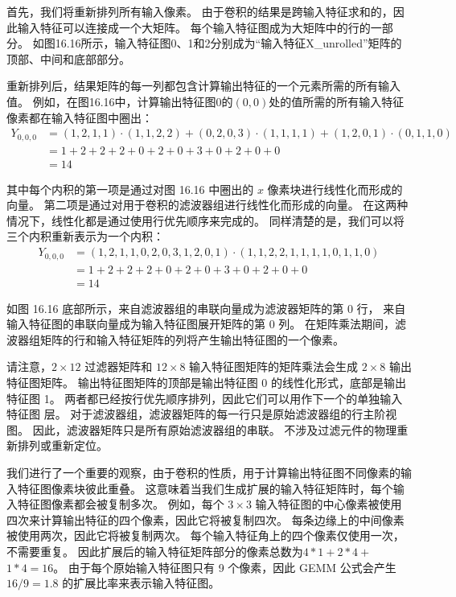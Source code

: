 首先，我们将重新排列所有输入像素。 由于卷积的结果是跨输入特征求和的，因此输入特征可以连接成一个大矩阵。 
每个输入特征图成为大矩阵中的行的一部分。 
如图16.16所示，输入特征图0、1和2分别成为“输入特征X\_unrolled”矩阵的顶部、中间和底部部分。

重新排列后，结果矩阵的每一列都包含计算输出特征的一个元素所需的所有输入值。 
例如，在图16.16中，计算输出特征图0的$(0,0)$处的值所需的所有输入特征像素都在输入特征图中圈出：
$$
\begin{aligned}
Y_{0,0,0} & =(1,2,1,1) \cdot(1,1,2,2)+(0,2,0,3) \cdot(1,1,1,1 )+(1,2,0,1) \cdot(0,1,1,0) \\
& =1+2+2+2+0+2+0+3+0+2+0+0 \\
&=14
\end{aligned}
$$

其中每个内积的第一项是通过对图 16.16 中圈出的 $x$ 像素块进行线性化而形成的向量。 
第二项是通过对用于卷积的滤波器组进行线性化而形成的向量。 在这两种情况下，线性化都是通过使用行优先顺序来完成的。 
同样清楚的是，我们可以将三个内积重新表示为一个内积：
$$
\begin{aligned}
Y_{0,0,0} & =(1,2,1,1,0,2,0,3,1,2,0,1) \cdot(1,1,2,2,1,1, 1,1,0,1,1,0) \\
& =1+2+2+2+0+2+0+3+0+2+0+0 \\
&=14
\end{aligned}
$$

如图 16.16 底部所示，来自滤波器组的串联向量成为滤波器矩阵的第 0 行，
来自输入特征图的串联向量成为输入特征图展开矩阵的第 0 列。 
在矩阵乘法期间，滤波器组矩阵的行和输入特征矩阵的列将产生输出特征图的一个像素。

请注意，$2 \times 12$ 过滤器矩阵和 $12 \times 8$ 输入特征图矩阵的矩阵乘法会生成 $2 \times 8$ 输出特征图矩阵。 
输出特征图矩阵的顶部是输出特征图 0 的线性化形式，底部是输出特征图 1。
两者都已经按行优先顺序排列，因此它们可以用作下一个的单独输入特征图 层。 
对于滤波器组，滤波器矩阵的每一行只是原始滤波器组的行主阶视图。 
因此，滤波器矩阵只是所有原始滤波器组的串联。 不涉及过滤元件的物理重新排列或重新定位。

我们进行了一个重要的观察，由于卷积的性质，用于计算输出特征图不同像素的输入特征图像素块彼此重叠。 
这意味着当我们生成扩展的输入特征矩阵时，每个输入特征图像素都会被复制多次。 
例如，每个 $3 \times 3$ 输入特征图的中心像素被使用四次来计算输出特征的四个像素，因此它将被复制四次。 
每条边缘上的中间像素被使用两次，因此它将被复制两次。 每个输入特征角上的四个像素仅使用一次，不需要重复。 
因此扩展后的输入特征矩阵部分的像素总数为$4 * 1+2 * 4+$ $1 * 4=16$。 
由于每个原始输入特征图只有 9 个像素，因此 GEMM 公式会产生 $16 / 9=1.8$ 的扩展比率来表示输入特征图。

